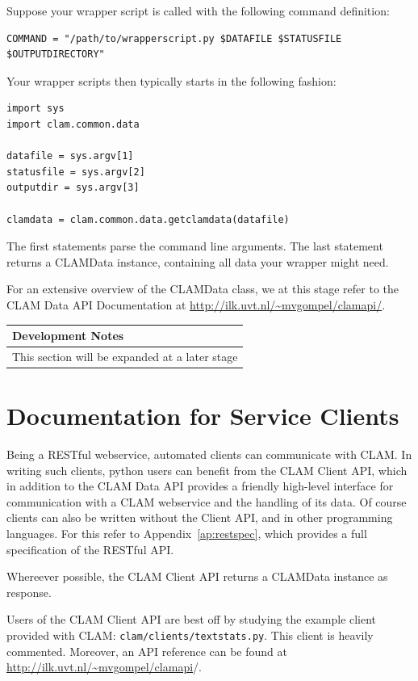 \documentclass[a4paper,12pt]{report}
\newenvironment{devnotes}
{\newpage
\begin{center}
    \begin{tabular}[h!]{|p{0.8\textwidth}|}
    \hline
    {\bf Development Notes}\\\hline}
{   \\\hline
    \end{tabular}
\end{center}}
\begin{document}
Suppose your wrapper script is called with the following command definition:

\begin{verbatim}
COMMAND = "/path/to/wrapperscript.py $DATAFILE $STATUSFILE $OUTPUTDIRECTORY" 
\end{verbatim}


Your wrapper scripts then typically starts in the following fashion:


\begin{verbatim}
import sys
import clam.common.data

datafile = sys.argv[1]
statusfile = sys.argv[2]
outputdir = sys.argv[3]

clamdata = clam.common.data.getclamdata(datafile)
\end{verbatim}

The first statements parse the command line arguments. The last statement returns a CLAMData instance, containing all data your wrapper might need.

For an extensive overview of the CLAMData class, we at this stage refer to the CLAM Data API Documentation at \url{http://ilk.uvt.nl/~mvgompel/clamapi/}.

\begin{devnotes}
This section will be expanded at a later stage
\end{devnotes}


\chapter{Documentation for Service Clients}

Being a RESTful webservice, automated clients can communicate with CLAM. In writing such clients, python users can benefit from the CLAM Client API, which in addition to the CLAM Data API provides a friendly high-level interface for communication with a CLAM webservice and the handling of its data. Of course clients can also be written without the Client API, and in other programming languages. For this refer to Appendix~\ref{ap:restspec}, which provides a full specification of the RESTful API.

Whereever possible, the CLAM Client API returns a CLAMData instance as response.

Users of the CLAM Client API are best off by studying the example client provided with CLAM: \texttt{clam/clients/textstats.py}. This client is heavily commented. Moreover, an API reference can be found at \url{http://ilk.uvt.nl/~mvgompel/clamapi}/.
\end{document}
